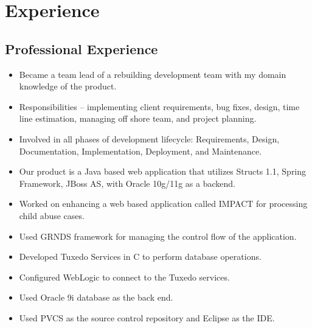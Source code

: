 \documentclass[11pt,letterpaper,sans]{moderncv} %
\begin{document}

\section{Experience}

  \subsection{Professional Experience}
     {\begin{itemize}
         \item Became a team lead of a rebuilding development team with my domain knowledge of the product.
         \item Responsibilities -- implementing client requirements, bug fixes, design, time line estimation, managing off shore team, and project planning.
         \item Involved in all phases of development lifecycle: Requirements, Design, Documentation, Implementation, Deployment, and Maintenance.
         \item Our product is a Java based web application that utilizes Structs 1.1, Spring Framework, JBoss AS, with Oracle 10g/11g as a backend.
     \end{itemize}}
     
     {\begin{itemize}
         \item Worked on enhancing a web based application called IMPACT for processing child abuse cases.
         \item Used GRNDS framework for managing the control flow of the application.
         \item Developed Tuxedo Services in C to perform database operations.
         \item Configured WebLogic to connect to the Tuxedo services.
         \item Used Oracle 9i database as the back end.
         \item Used PVCS as the source control repository and Eclipse as the IDE.
     \end{itemize}}
\end{document}
